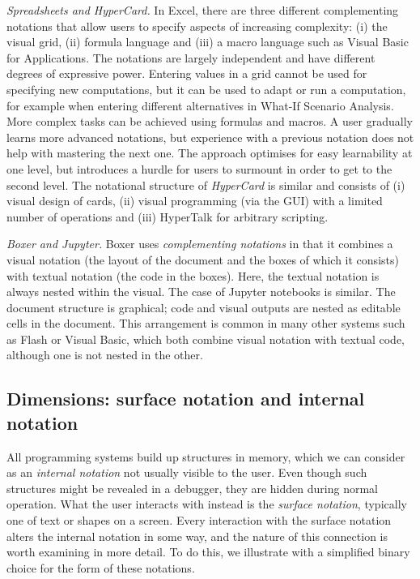\documentclass[ twoside,openright,titlepage,numbers=noenddot,headinclude,footinclude,cleardoublepage=empty,abstract=on,
                BCOR=5mm,paper=a4,fontsize=11pt
                ]{scrreprt}
\theoremstyle{definition}
\begin{document}
\emph{Spreadsheets and HyperCard.} In Excel, there are three different
complementing notations that allow users to specify aspects of
increasing complexity: (i) the visual grid, (ii) formula language and
(iii) a macro language such as Visual Basic for Applications. The
notations are largely independent and have different degrees of
expressive power. Entering values in a grid cannot be used for
specifying new computations, but it can be used to adapt or run a
computation, for example when entering different alternatives in What-If
Scenario Analysis. More complex tasks can be achieved using formulas and
macros. A user gradually learns more advanced notations, but experience
with a previous notation does not help with mastering the next one. The
approach optimises for easy learnability at one level, but introduces a
hurdle for users to surmount in order to get to the second level. The
notational structure of \emph{HyperCard} is similar and consists of (i)
visual design of cards, (ii) visual programming (via the GUI) with a
limited number of operations and (iii) HyperTalk for arbitrary
scripting.

\emph{Boxer and Jupyter.} Boxer \parencite{Boxer} uses
\emph{complementing notations} in that it combines a visual notation
(the layout of the document and the boxes of which it consists) with
textual notation (the code in the boxes). Here, the textual notation is
always nested within the visual. The case of Jupyter notebooks is
similar. The document structure is graphical; code and visual outputs
are nested as editable cells in the document. This arrangement is common
in many other systems such as Flash or Visual Basic, which both combine
visual notation with textual code, although one is not nested in the
other.

\hypertarget{dimensions-surface-notation-and-internal-notation}{\subsection{Dimensions: surface notation and internal
notation}\label{dimensions-surface-notation-and-internal-notation}}

All programming systems build up structures in memory, which we can
consider as an \emph{internal notation} not usually visible to the user.
Even though such structures might be revealed in a debugger, they are
hidden during normal operation. What the user interacts with instead is
the \emph{surface notation}, typically one of text or shapes on a
screen. Every interaction with the surface notation alters the internal
notation in some way, and the nature of this connection is worth
examining in more detail. To do this, we illustrate with a simplified
binary choice for the form of these notations.
\end{document}
